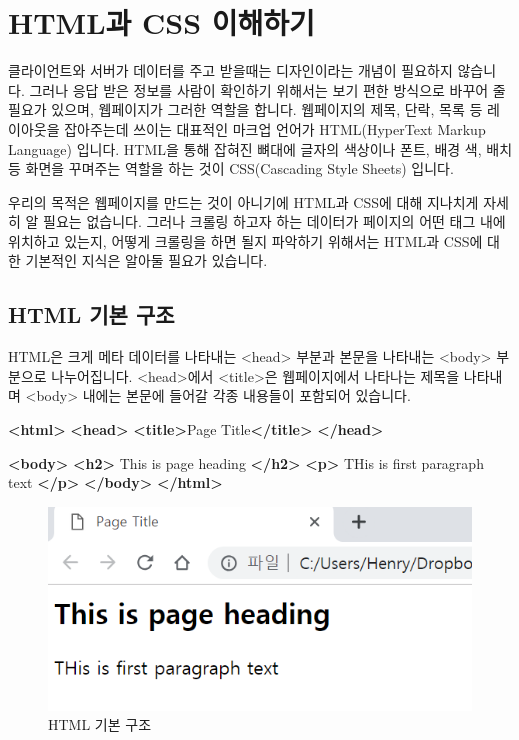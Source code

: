 \documentclass[]{book}
\newenvironment{Shaded}{\begin{snugshade}}{\end{snugshade}}
\newcommand{\KeywordTok}[1]{\textcolor[rgb]{0.13,0.29,0.53}{\textbf{#1}}}
\newcommand{\NormalTok}[1]{#1}
\begin{document}
\hypertarget{html-css-}{%
\section{HTML과 CSS 이해하기}\label{html-css-}}

클라이언트와 서버가 데이터를 주고 받을때는 디자인이라는 개념이 필요하지 않습니다. 그러나 응답 받은 정보를 사람이 확인하기 위해서는 보기 편한 방식으로 바꾸어 줄 필요가 있으며, 웹페이지가 그러한 역할을 합니다. 웹페이지의 제목, 단락, 목록 등 레이아웃을 잡아주는데 쓰이는 대표적인 마크업 언어가 HTML(HyperText Markup Language) 입니다. HTML을 통해 잡혀진 뼈대에 글자의 색상이나 폰트, 배경 색, 배치 등 화면을 꾸며주는 역할을 하는 것이 CSS(Cascading Style Sheets) 입니다.

우리의 목적은 웹페이지를 만드는 것이 아니기에 HTML과 CSS에 대해 지나치게 자세히 알 필요는 없습니다. 그러나 크롤링 하고자 하는 데이터가 페이지의 어떤 태그 내에 위치하고 있는지, 어떻게 크롤링을 하면 될지 파악하기 위해서는 HTML과 CSS에 대한 기본적인 지식은 알아둘 필요가 있습니다.

\hypertarget{html--}{%
\subsection{HTML 기본 구조}\label{html--}}

HTML은 크게 메타 데이터를 나타내는 \textless{}head\textgreater{} 부분과 본문을 나타내는 \textless{}body\textgreater{} 부분으로 나누어집니다. \textless{}head\textgreater{}에서 \textless{}title\textgreater{}은 웹페이지에서 나타나는 제목을 나타내며 \textless{}body\textgreater{} 내에는 본문에 들어갈 각종 내용들이 포함되어 있습니다.

\begin{Shaded}
\begin{Highlighting}[]
\KeywordTok{<html>}
\KeywordTok{<head>}
\KeywordTok{<title>}\NormalTok{Page Title}\KeywordTok{</title>}
\KeywordTok{</head>}

\KeywordTok{<body>}
\KeywordTok{<h2>}\NormalTok{ This is page heading }\KeywordTok{</h2>}
\KeywordTok{<p>}\NormalTok{ THis is first paragraph text }\KeywordTok{</p>}
\KeywordTok{</body>}
\KeywordTok{</html>}
\end{Highlighting}
\end{Shaded}

\begin{figure}

{\centering \includegraphics[width=0.5\linewidth]{images/html_1} 

}

\caption{HTML 기본 구조}\label{fig:unnamed-chunk-9}
\end{figure}
\end{document}

